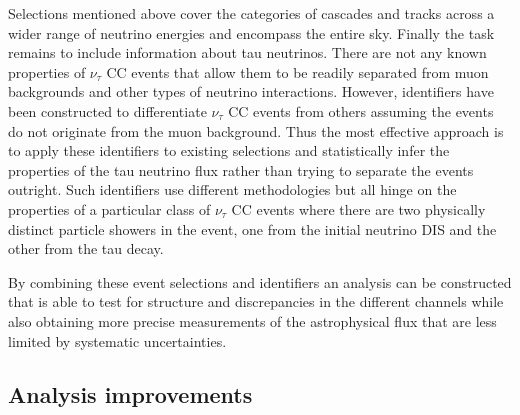 Selections mentioned above cover the categories of cascades and tracks across a wider range of neutrino energies and encompass the entire sky.
Finally the task remains to include information about tau neutrinos.
There are not any known properties of $\nu_\tau$ CC events that allow them to be readily separated from muon backgrounds and other types of neutrino interactions.
However, identifiers have been constructed to differentiate $\nu_\tau$ CC events from others assuming the events do not originate from the muon background.
Thus the most effective approach is to apply these identifiers to existing selections and statistically infer the properties of the tau neutrino flux rather than trying to separate the events outright.
Such identifiers use different methodologies but all hinge on the properties of a particular class of $\nu_\tau$ CC events where there are two physically distinct particle showers in the event, one from the initial neutrino DIS and the other from the tau decay.

By combining these event selections and identifiers an analysis can be constructed that is able to test for structure and discrepancies in the different channels while also obtaining more precise measurements of the astrophysical flux that are less limited by systematic uncertainties.

\subsection{Analysis improvements}

